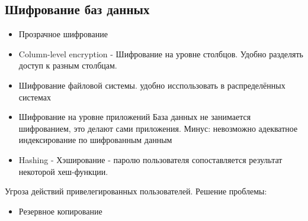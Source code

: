 \documentclass{article}
\begin{document}
    \subsection{Шифрование баз данных}
    \begin{itemize}
        \item Прозрачное шифрование 
        \item Column-level encryption - Шифрование на уровне столбцов. Удобно разделять доступ к разным столбцам.
        \item Шифрование файловой системы.
        \newline удобно исспользовать в распределённых системах
        \item Шифрование на уровне приложений
        \newline База данных не занимается шифрованием, это делают сами приложения.
        \newline Минус: невозможно адекватное индексирование по шифрованным данным
        \item Hashing - Хэширование - паролю пользователя сопоставляется результат некоторой хеш-функции.
    \end{itemize}
    
    Угроза действий привелегированных пользователей. 
    Решение проблемы:
    \begin{itemize}
        \item Резервное копирование
    \end{itemize}
    
\end{document}
